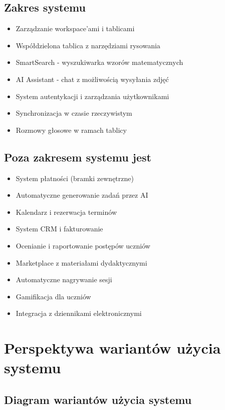 \documentclass[12pt,a4paper]{article}
\begin{document}
\subsection{Zakres systemu}

\begin{itemize}[leftmargin=*]
    \item Zarządzanie workspace'ami i tablicami
    \item Współdzielona tablica z narzędziami rysowania
    \item SmartSearch - wyszukiwarka wzorów matematycznych
    \item AI Assistant - chat z możliwością wysyłania zdjęć
    \item System autentykacji i zarządzania użytkownikami
    \item Synchronizacja w czasie rzeczywistym
    \item Rozmowy głosowe w ramach tablicy
\end{itemize}

\subsection{Poza zakresem systemu jest}

\begin{itemize}[leftmargin=*]
    \item System płatności (bramki zewnętrzne)
    \item Automatyczne generowanie zadań przez AI
    \item Kalendarz i rezerwacja terminów
    \item System CRM i fakturowanie
    \item Ocenianie i raportowanie postępów uczniów
    \item Marketplace z materiałami dydaktycznymi
    \item Automatyczne nagrywanie sesji
    \item Gamifikacja dla uczniów
    \item Integracja z dziennikami elektronicznymi
\end{itemize}

\section{Perspektywa wariantów użycia systemu}

\subsection{Diagram wariantów użycia systemu}
\end{document}
